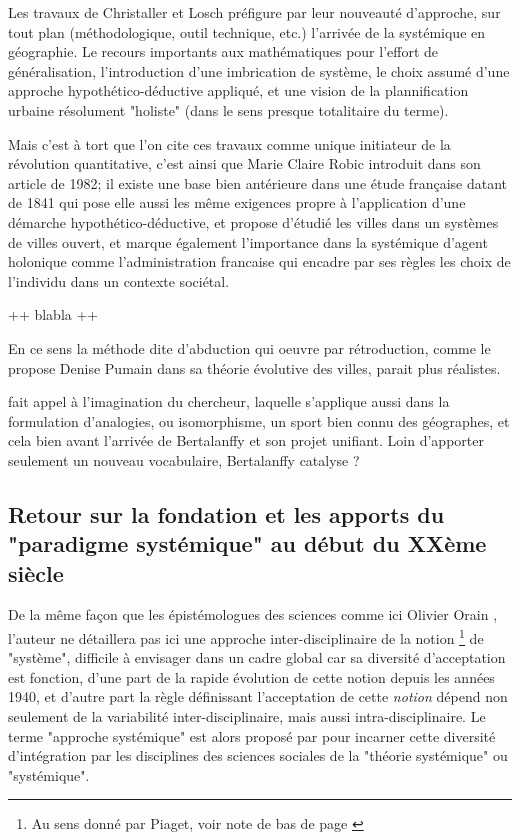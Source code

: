 {Les travaux de Christaller et Losch préfigure par leur nouveauté d'approche, sur tout plan (méthodologique, outil technique, etc.) l'arrivée de la systémique en géographie. Le recours importants aux mathématiques pour l'effort de généralisation, l'introduction d'une imbrication de système, le choix assumé d'une approche hypothético-déductive appliqué, et une vision de la plannification urbaine résolument "holiste" (dans le sens presque totalitaire du terme).

Mais c'est à tort que l'on cite ces travaux comme unique initiateur de la révolution quantitative, c'est ainsi que Marie Claire Robic \autocite{Robic1982} introduit dans son article de 1982; il existe une base bien antérieure dans une étude française datant de 1841 qui pose elle aussi les même exigences propre à l'application d'une démarche hypothético-déductive, et propose d'étudié les villes dans un systèmes de villes ouvert, et marque également l'importance dans la systémique d'agent holonique comme l'administration francaise qui encadre par ses règles les choix de l'individu dans un contexte sociétal. 





++ blabla ++

En ce sens la méthode dite d'abduction qui oeuvre par rétroduction, comme le propose Denise Pumain dans sa théorie évolutive des villes, parait plus réalistes.

fait appel à l'imagination du chercheur, laquelle s'applique aussi dans la formulation d'analogies, ou isomorphisme, un sport bien connu des géographes, et cela bien avant l'arrivée de Bertalanffy et son projet unifiant. 
Loin d'apporter seulement un nouveau vocabulaire, Bertalanffy catalyse ?


\subsection{Retour sur la fondation et les apports du "paradigme systémique" au début du XXème siècle}
\label{ssec:systemique}

De la même façon que les épistémologues des sciences comme ici Olivier Orain \autocite{Orain2001}, l'auteur ne détaillera pas ici une approche inter-disciplinaire de la notion \footnote{Au sens donné par Piaget, voir note de bas de page \autocite {Orain2001}} de "système", difficile à envisager dans un cadre global car sa diversité d'acceptation est fonction, d'une part de la rapide évolution de cette notion depuis les années 1940, et d'autre part la règle définissant l'acceptation de cette \textit{notion} dépend non seulement de la variabilité inter-disciplinaire, mais aussi intra-disciplinaire. Le terme "approche systémique" est alors proposé par \autocite{Orain2001} pour incarner cette diversité d'intégration par les disciplines des sciences sociales de la "théorie systémique" ou "systémique".

}
